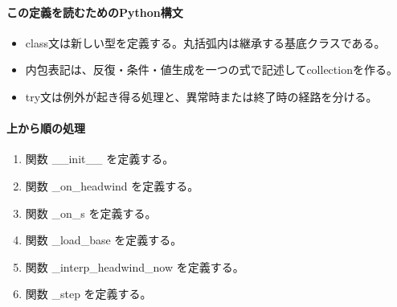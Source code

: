 \documentclass[a4paper,11pt]{article}
\begin{document}
            \paragraph{この定義を読むためのPython構文}
            \begin{itemize}[leftmargin=1.6em]
            \item class文は新しい型を定義する。丸括弧内は継承する基底クラスである。
\item 内包表記は、反復・条件・値生成を一つの式で記述してcollectionを作る。
\item try文は例外が起き得る処理と、異常時または終了時の経路を分ける。
            \end{itemize}
            \paragraph{上から順の処理}
            \begin{enumerate}[leftmargin=1.8em]
            \item 関数 \_\_init\_\_ を定義する。
\item 関数 \_on\_headwind を定義する。
\item 関数 \_on\_s を定義する。
\item 関数 \_load\_base を定義する。
\item 関数 \_interp\_headwind\_now を定義する。
\item 関数 \_step を定義する。
            \end{enumerate}
\end{document}
